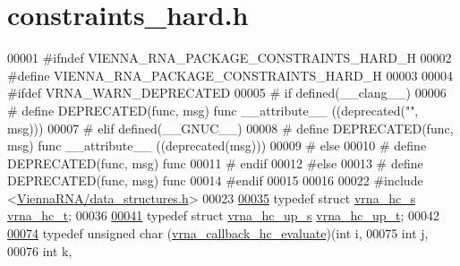 \hypertarget{constraints__hard_8h_source}{}\section{constraints\+\_\+hard.\+h}
\label{constraints__hard_8h_source}

\begin{DoxyCode}
00001 \textcolor{preprocessor}{#ifndef VIENNA\_RNA\_PACKAGE\_CONSTRAINTS\_HARD\_H}
00002 \textcolor{preprocessor}{#define VIENNA\_RNA\_PACKAGE\_CONSTRAINTS\_HARD\_H}
00003 
00004 \textcolor{preprocessor}{#ifdef VRNA\_WARN\_DEPRECATED}
00005 \textcolor{preprocessor}{# if defined(\_\_clang\_\_)}
00006 \textcolor{preprocessor}{#  define DEPRECATED(func, msg) func \_\_attribute\_\_ ((deprecated("", msg)))}
00007 \textcolor{preprocessor}{# elif defined(\_\_GNUC\_\_)}
00008 \textcolor{preprocessor}{#  define DEPRECATED(func, msg) func \_\_attribute\_\_ ((deprecated(msg)))}
00009 \textcolor{preprocessor}{# else}
00010 \textcolor{preprocessor}{#  define DEPRECATED(func, msg) func}
00011 \textcolor{preprocessor}{# endif}
00012 \textcolor{preprocessor}{#else}
00013 \textcolor{preprocessor}{# define DEPRECATED(func, msg) func}
00014 \textcolor{preprocessor}{#endif}
00015 
00016 
00022 \textcolor{preprocessor}{#include <\hyperlink{data__structures_8h}{ViennaRNA/data\_structures.h}>}
00023 
\hyperlink{group__hard__constraints_gac7e4c4f8abe3163a68110c5bff24e01d}{00035} \textcolor{keyword}{typedef} \textcolor{keyword}{struct  }\hyperlink{group__hard__constraints_structvrna__hc__s}{vrna\_hc\_s} \hyperlink{group__hard__constraints_structvrna__hc__s}{vrna\_hc\_t};
00036 
\hyperlink{group__hard__constraints_ga8cd53427a942a81c87ec526bbff32ef9}{00041} \textcolor{keyword}{typedef} \textcolor{keyword}{struct }\hyperlink{group__hard__constraints_structvrna__hc__up__s}{vrna\_hc\_up\_s} \hyperlink{group__hard__constraints_structvrna__hc__up__s}{vrna\_hc\_up\_t};
00042 
\hyperlink{group__hard__constraints_gae465f1d4a3d8b6592b38ecbb0d9f613d}{00074} \textcolor{keyword}{typedef} \textcolor{keywordtype}{unsigned} char (\hyperlink{group__hard__constraints_gae465f1d4a3d8b6592b38ecbb0d9f613d}{vrna\_callback\_hc\_evaluate})(\textcolor{keywordtype}{int}           i,
00075                                                   \textcolor{keywordtype}{int}           j,
00076                                                   \textcolor{keywordtype}{int}           k,

\end{DoxyCode}
